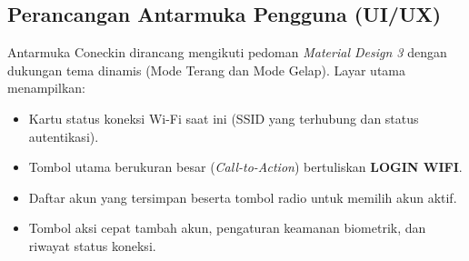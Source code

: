 \subsection{Perancangan Antarmuka Pengguna (UI/UX)}
Antarmuka Coneckin dirancang mengikuti pedoman \textit{Material Design 3} dengan dukungan tema dinamis (Mode Terang dan Mode Gelap). Layar utama menampilkan:
\begin{itemize}
    \item Kartu status koneksi Wi-Fi saat ini (SSID yang terhubung dan status autentikasi).
    \item Tombol utama berukuran besar (\textit{Call-to-Action}) bertuliskan \textbf{LOGIN WIFI}.
    \item Daftar akun yang tersimpan beserta tombol radio untuk memilih akun aktif.
    \item Tombol aksi cepat tambah akun, pengaturan keamanan biometrik, dan riwayat status koneksi.
\end{itemize}
